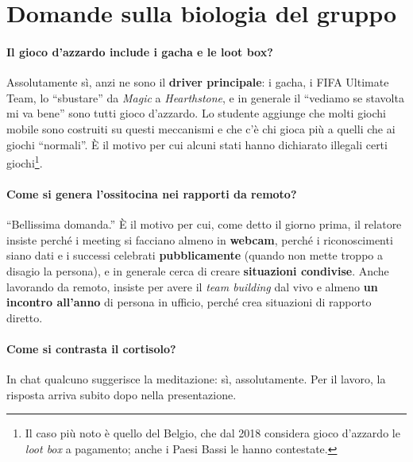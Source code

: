 \section{Domande sulla biologia del gruppo}
\label{sec:z2-qa-biologia}

\paragraph{Il gioco d'azzardo include i gacha e le loot box?} Assolutamente sì, anzi ne sono il
\textbf{driver principale}: i gacha, i FIFA Ultimate Team, lo ``sbustare'' da \emph{Magic} a
\emph{Hearthstone}, e in generale il ``vediamo se stavolta mi va bene'' sono tutti gioco
d'azzardo. Lo studente aggiunge che molti giochi mobile sono costruiti su questi meccanismi e che
c'è chi gioca più a quelli che ai giochi ``normali''. È il motivo per cui alcuni stati hanno
dichiarato illegali certi giochi\footnote{Il caso più noto è quello del Belgio, che dal 2018
considera gioco d'azzardo le \emph{loot box} a pagamento; anche i Paesi Bassi le hanno
contestate.}.

\paragraph{Come si genera l'ossitocina nei rapporti da remoto?} ``Bellissima domanda.'' È il motivo
per cui, come detto il giorno prima, il relatore insiste perché i meeting si facciano almeno in
\textbf{webcam}, perché i riconoscimenti siano dati e i successi celebrati \textbf{pubblicamente}
(quando non mette troppo a disagio la persona), e in generale cerca di creare \textbf{situazioni
condivise}. Anche lavorando da remoto, insiste per avere il \emph{team building} dal vivo e almeno
\textbf{un incontro all'anno} di persona in ufficio, perché crea situazioni di rapporto diretto.

\paragraph{Come si contrasta il cortisolo?} In chat qualcuno suggerisce la meditazione: sì,
assolutamente. Per il lavoro, la risposta arriva subito dopo nella presentazione.

